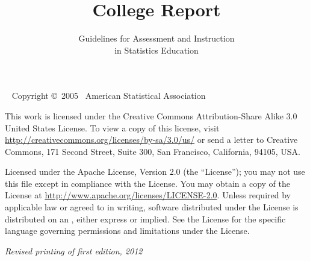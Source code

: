 \documentclass[twoside,openany]{tufte-book}
\title[GAISE College Report]{College Report}
\author[Guidelines for Assessment and Instruction in Statistics Education]{Guidelines for Assessment and Instruction\\ \noindent in Statistics Education}
\begin{document}
\frontmatter




\maketitle


\newpage
\begin{fullwidth}
~\vfill
\thispagestyle{empty}
\setlength{\parindent}{0pt}
\setlength{\parskip}{\baselineskip}
Copyright \copyright\ 2005~ American Statistical Association

\par{}

\par This work is licensed under the Creative Commons Attribution-Share Alike 3.0 United States License. To view a copy of this license, visit \url{http://creativecommons.org/licenses/by-sa/3.0/us/} or send a letter to Creative Commons, 171 Second Street, Suite 300, San Francisco, California, 94105, USA. 

\par{}

\par Licensed under the Apache License, Version 2.0 (the ``License''); you may not
use this file except in compliance with the License. You may obtain a copy
of the License at \url{http://www.apache.org/licenses/LICENSE-2.0}. Unless
required by applicable law or agreed to in writing, software distributed
under the License is distributed on an , either express or implied. See the
License for the specific language governing permissions and limitations
under the License.

\par\textit{Revised printing of first edition, 2012}
\end{fullwidth}

\tableofcontents


\end{document}
